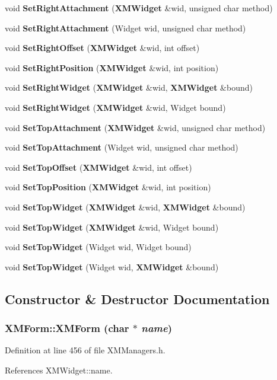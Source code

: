 \begin{CompactItemize}
\item 
void {\bf Set\-Right\-Attachment} ({\bf XMWidget} \&wid, unsigned char method)
\item 
void {\bf Set\-Right\-Attachment} (Widget wid, unsigned char method)
\item 
void {\bf Set\-Right\-Offset} ({\bf XMWidget} \&wid, int offset)
\item 
void {\bf Set\-Right\-Position} ({\bf XMWidget} \&wid, int position)
\item 
void {\bf Set\-Right\-Widget} ({\bf XMWidget} \&wid, {\bf XMWidget} \&bound)
\item 
void {\bf Set\-Right\-Widget} ({\bf XMWidget} \&wid, Widget bound)
\item 
void {\bf Set\-Top\-Attachment} ({\bf XMWidget} \&wid, unsigned char method)
\item 
void {\bf Set\-Top\-Attachment} (Widget wid, unsigned char method)
\item 
void {\bf Set\-Top\-Offset} ({\bf XMWidget} \&wid, int offset)
\item 
void {\bf Set\-Top\-Position} ({\bf XMWidget} \&wid, int position)
\item 
void {\bf Set\-Top\-Widget} ({\bf XMWidget} \&wid, {\bf XMWidget} \&bound)
\item 
void {\bf Set\-Top\-Widget} ({\bf XMWidget} \&wid, Widget bound)
\item 
void {\bf Set\-Top\-Widget} (Widget wid, Widget bound)
\item 
void {\bf Set\-Top\-Widget} (Widget wid, {\bf XMWidget} \&bound)
\end{CompactItemize}


\subsection{Constructor \& Destructor Documentation}
\subsubsection{\setlength{\rightskip}{0pt plus 5cm}XMForm::XMForm (char $\ast$ {\em name})\hspace{0.3cm}{\tt  [inline]}}\label{classXMForm_a0}




Definition at line 456 of file XMManagers.h.

References XMWidget::name.
